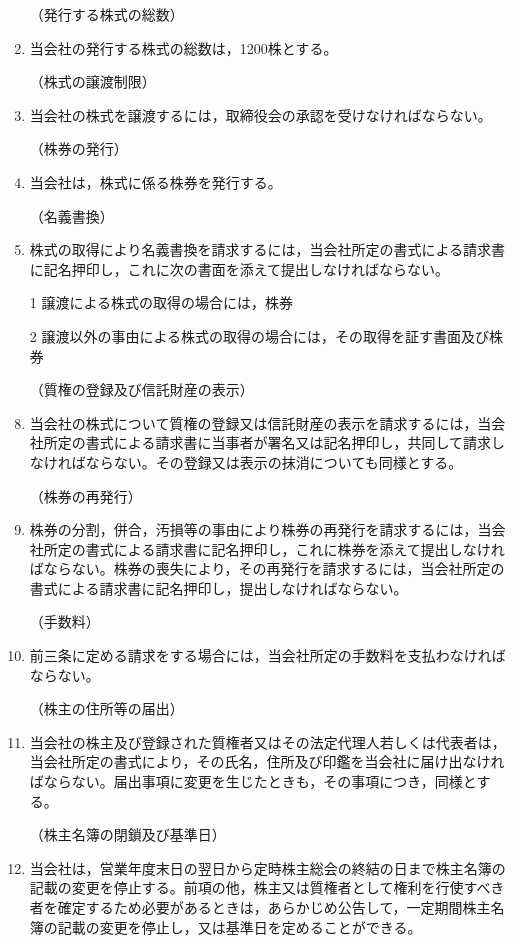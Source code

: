 \documentclass[11pt,a4paper]{jsarticle}
\makeatletter
\def\section{\@startsection{section}{1}{-40pt}{15pt}{10pt}{\normalfont\Large\bfseries\centering}}
\newcommand{\header}[1]{\vspace{5pt}\hspace{-42pt}（{#1}）}
\makeatother
\begin{document}
\begin{enumerate}
\section{株式}


\header{発行する株式の総数}
\item 当会社の発行する株式の総数は，1200株とする。

\header{株式の譲渡制限}
\item 当会社の株式を譲渡するには，取締役会の承認を受けなければならない。

\header{株券の発行}
\item 当会社は，株式に係る株券を発行する。

\header{名義書換}
\item 株式の取得により名義書換を請求するには，当会社所定の書式による請求書に記名押印し，これに次の書面を添えて提出しなければならない。
\item[1] 譲渡による株式の取得の場合には，株券
\item[2] 譲渡以外の事由による株式の取得の場合には，その取得を証す書面及び株券

\header{質権の登録及び信託財産の表示}
\item 当会社の株式について質権の登録又は信託財産の表示を請求するには，当会社所定の書式による請求書に当事者が署名又は記名押印し，共同して請求しなければならない。その登録又は表示の抹消についても同様とする。

\header{株券の再発行}
\item 株券の分割，併合，汚損等の事由により株券の再発行を請求するには，当会社所定の書式による請求書に記名押印し，これに株券を添えて提出しなければならない。株券の喪失により，その再発行を請求するには，当会社所定の書式による請求書に記名押印し，提出しなければならない。

\header{手数料}
\item 前三条に定める請求をする場合には，当会社所定の手数料を支払わなければならない。

\header{株主の住所等の届出}
\item 当会社の株主及び登録された質権者又はその法定代理人若しくは代表者は，当会社所定の書式により，その氏名，住所及び印鑑を当会社に届け出なければならない。届出事項に変更を生じたときも，その事項につき，同様とする。

\header{株主名簿の閉鎖及び基準日}
\item 当会社は，営業年度末日の翌日から定時株主総会の終結の日まで株主名簿の記載の変更を停止する。前項の他，株主又は質権者として権利を行使すべき者を確定するため必要があるときは，あらかじめ公告して，一定期間株主名簿の記載の変更を停止し，又は基準日を定めることができる。



\end{enumerate}
\end{document}
